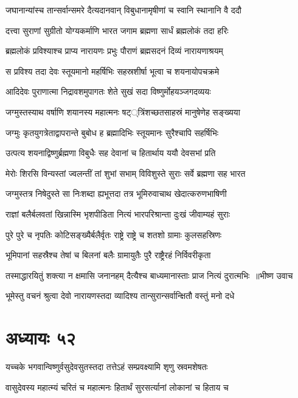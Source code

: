 \twolineshloka
{जघानान्यांस्च तान्सर्वान्समरे दैत्यदानवान्}
{विबुधानामृषीणां च स्वानि स्थानानि वै ददौ}


\twolineshloka
{दत्त्वा सुराणां सुग्रीतो योग्यकर्माणि भारत}
{जगाम ब्रह्मणा सार्धं ब्रह्मलोकं तदा हरिः}


\twolineshloka
{ब्रह्मलोकं प्रविश्याश्च प्राप्य नारायणः प्रभुः}
{पौराणं ब्रह्मसदनं दिव्यं नारायणाश्रयम्}


\twolineshloka
{स प्रविश्य तदा देवः स्तूयमानो महर्षिभिः}
{सहस्रशीर्षा भूत्वा च शयनायोपचक्रमे}


\twolineshloka
{आदिदेवः पुराणात्मा निद्रावशमुपागतः}
{शेते सुखं सदा विष्णुर्मोहयञ्जगदव्ययः}


\twolineshloka
{जग्मुस्तस्याथ वर्षाणि शयानस्य महात्मनः}
{षट््त्रिंशच्छतसाहस्रं मानुषेणेह सङ्ख्यया}


\twolineshloka
{जग्मुः कृतयुगत्रेताद्वापरान्ते बुबोध ह}
{ब्रह्मादिभिः स्तूयमानः सुरैश्चापि सहर्षिभिः}


\twolineshloka
{उत्पत्य शयनाद्विष्णुर्ब्रह्मणा विबुधैः सह}
{देवानां च हितार्थाय ययौ देवसभां प्रति}


\twolineshloka
{मेरोः शिरसि विन्यस्तां ज्वलन्तीं तां शुभां सभाम्}
{विविशुस्ते सुराः सर्वे ब्रह्मणा सह भारत}


\twolineshloka
{जग्मुस्तत्र निषेदुस्ते सा निःशब्दा ह्यभूत्तदा}
{तत्र भूमिरुवाचाथ खेदात्करुणभाषिणी}


\twolineshloka
{राज्ञां बलैर्बलवतां खिन्नास्मि भृशपीडिता}
{नित्यं भारपरिश्रान्ता दुःखं जीवाम्यहं सुराः}


\twolineshloka
{पुरे पुरे च नृपतिः कोटिसङ्ख्यैर्बलैर्वृतः}
{राष्ट्रे राष्ट्रे च शतशो ग्रामाः कुलसहस्रिणः}


\twolineshloka
{भूमिपानां सहस्रैश्च तेषां च बिलनां बलैः}
{ग्रामायुतैः पुरै राष्ट्रैरहं निर्विवरीकृता}


\threelineshloka
{तस्माद्धारयितुं शक्त्या न क्षमासि जनानहम्}
{दैत्यैश्च बाध्यमानास्ताः प्राज नित्यं दुरात्मभिः ॥भीष्ण उवाच}
{}


\twolineshloka
{भूमेस्तु वचनं श्रुत्वा देवो नारायणस्तदा}
{व्यादिश्य तान्सुरान्सर्वान्क्षितौ वस्तुं मनो दधे}


\chapter{अध्यायः ५२}
\twolineshloka
{यच्चके भगवान्विष्णुर्वसुदेवसुतस्तदा}
{तत्तेऽहं सम्प्रवक्ष्यामि शृणु स्रवमशेषतः}


\twolineshloka
{वासुदेवस्य महात्म्यं चरितं च महात्मनः}
{हितार्थं सुरसर्त्यानां लोकानां च हिताय च}


